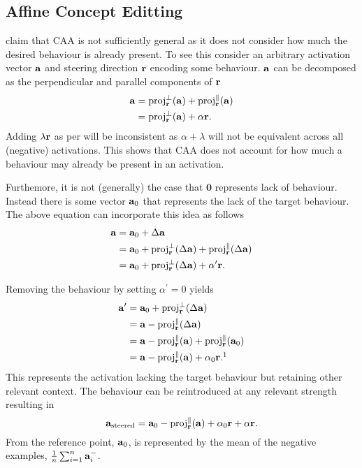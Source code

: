 \subsection{Affine Concept Editting}
\label{ace}

\citet{ace} claim that CAA \cite{caa} is not sufficiently general as it does not consider how much the desired behaviour is already present.
To see this consider an arbitrary activation vector $\mathbf{a}$ and steering direction $\mathbf{r}$ encoding some behaviour.
$\mathbf{a}$ can be decomposed as the perpendicular and parallel components of $\mathbf{r}$
\begin{align*}
    \mathbf{a} &= \text{proj}_{\mathbf{r}}^{\perp}(\mathbf{a}) + \text{proj}_{\mathbf{r}}^{\parallel}(\mathbf{a}) \\
        &= \text{proj}_{\mathbf{r}}^{\perp}(\mathbf{a}) + \alpha\mathbf{r}.
\end{align*}
Adding $\lambda\mathbf{r}$ as per  will be inconsistent as $\alpha + \lambda$ will not be equivalent across all (negative) activations.
This shows that CAA \cite{caa} does not account for how much a behaviour may already be present in an activation.

Furthemore, it is not (generally) the case that $\mathbf{0}$ represents lack of behaviour.
Instead there is some vector $\mathbf{a}_0$ that represents the lack of the target behaviour.
The above equation can incorporate this idea as follows
\begin{align*}
    \mathbf{a} &= \mathbf{a}_0 + \Delta\mathbf{a} \\
        &= \mathbf{a}_0 + \text{proj}_{\mathbf{r}}^{\perp}(\Delta\mathbf{a}) + \text{proj}_{\mathbf{r}}^{\parallel}(\Delta\mathbf{a}) \\
        &= \mathbf{a}_0 + \text{proj}_{\mathbf{r}}^{\perp}(\Delta\mathbf{a}) + \alpha^\prime\mathbf{r}.
\end{align*}

Removing the behaviour by setting $\alpha^\prime = 0$ yields
\begin{align*}
    \va^\prime &= \va_0 + \text{proj}_\vr^{\perp}(\Delta\va) \\
               &= \va - \text{proj}_\vr^{\parallel}(\Delta\va) \\
               &= \va - \text{proj}_\vr^{\parallel}(\va) + \text{proj}_\vr^{\parallel}(\va_0) \\
               &= \va - \text{proj}_\vr^{\parallel}(\va) + \alpha_0\vr.\footnotemark[1]
\end{align*}
This represents the activation lacking the target behaviour but retaining other relevant context.
The behaviour can be reintroduced at any relevant strength resulting in
\begin{equation}
    \label{eq:ace}
    \mathbf{a}_\text{steered} = \mathbf{a}_0 - \text{proj}_{\mathbf{r}}^{\parallel}(\mathbf{a}) + \alpha_0\mathbf{r} + \alpha\mathbf{r}.
\end{equation}
From  the reference point, $\mathbf{a}_0$, is represented by the mean of the negative examples, $\frac{1}{n}\sum_{i=1}^{n}\mathbf{a}_i^-$.

